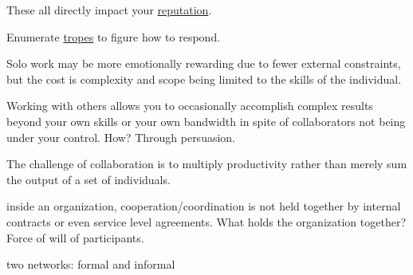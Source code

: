 These all directly impact your 
\hyperref[sec:reputation]{reputation}.

Enumerate \hyperref[sec:tropes]{tropes} to figure how to respond.


Solo work may be more emotionally rewarding due to fewer external constraints, but the cost is complexity and scope being limited to the skills of the individual. 

Working with others allows you to occasionally accomplish complex results beyond your own skills or your own bandwidth in spite of collaborators not being under your control. How? Through persuasion. 

The challenge of collaboration is to multiply productivity rather than merely sum the output of a set of individuals. 

inside an organization, cooperation/coordination is not held together by internal contracts or even service level agreements. What holds the organization together? Force of will of participants. 

two networks: formal and informal